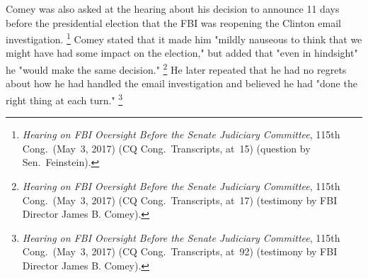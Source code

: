 Comey was also asked at the hearing about his decision to announce 11 days before the presidential election that the FBI was reopening the Clinton email investigation.%
\footnote{\textit{Hearing on FBI Oversight Before the Senate Judiciary Committee}, 115th Cong.\ (May~3, 2017) (CQ Cong.\ Transcripts, at~15) (question by Sen.~Feinstein).}
Comey stated that it made him "mildly nauseous to think that we might have had some impact on the election," but added that "even in hindsight" he "would make the same decision."%
\footnote{\textit{Hearing on FBI Oversight Before the Senate Judiciary Committee}, 115th Cong.\ (May~3, 2017) (CQ Cong.\ Transcripts, at~17) (testimony by FBI Director James B. Comey).}
He later repeated that he had no regrets about how he had handled the email investigation and believed he had "done the right thing at each turn."%
\footnote{\textit{Hearing on FBI Oversight Before the Senate Judiciary Committee}, 115th Cong.\ (May~3, 2017) (CQ Cong.\ Transcripts, at~92) (testimony by FBI Director James B. Comey).}


